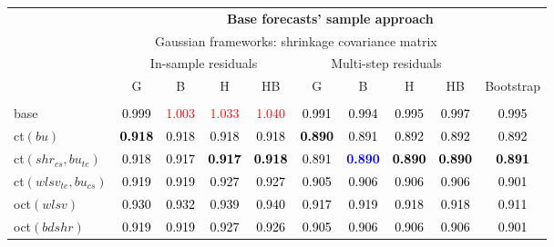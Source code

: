 
\begin{tabular}[t]{>{\centering\arraybackslash}m{2.5cm}ccccccccc}
\toprule
\multicolumn{1}{c}{\textbf{}} & \multicolumn{9}{c}{\textbf{Base forecasts' sample approach}} \\
\cmidrule(l{0pt}r{0pt}){2-10}
\multicolumn{1}{c}{} & \multicolumn{8}{c}{Gaussian frameworks: shrinkage covariance matrix} & \multicolumn{1}{c}{} \\
\multicolumn{1}{c}{} & \multicolumn{4}{c}{In-sample residuals} & \multicolumn{4}{c}{Multi-step residuals} & \multicolumn{1}{c}{} \\
\multirow{-5}{*}{\parbox{2cm}{\centering\textbf{Reconciliation\\approach}}} & G & B & H & HB & G & B & H & HB & \multirow{-4}{*}{Bootstrap}\\
\midrule
\addlinespace[0.3em]
\multicolumn{10}{c}{\textbf{$\forall k \in \{2,1\}$}}\\
base & \textcolor{black}{0.999} & \textcolor{red}{1.003} & \textcolor{red}{1.033} & \textcolor{red}{1.040} & \textcolor{black}{0.991} & \textcolor{black}{0.994} & \textcolor{black}{0.995} & \textcolor{black}{0.997} & \textcolor{black}{0.995}\\
ct$(bu)$ & \textcolor{black}{\textbf{0.918}} & \textcolor{black}{0.918} & \textcolor{black}{0.918} & \textcolor{black}{0.918} & \textcolor{black}{\textbf{0.890}} & \textcolor{black}{0.891} & \textcolor{black}{0.892} & \textcolor{black}{0.892} & \textcolor{black}{0.892}\\
ct$(shr_{cs}, bu_{te})$ & \textcolor{black}{0.918} & \textcolor{black}{0.917} & \textcolor{black}{\textbf{0.917}} & \textcolor{black}{\textbf{0.918}} & \textcolor{black}{0.891} & \textcolor{blue}{\textbf{0.890}} & \textcolor{black}{\textbf{0.890}} & \textcolor{black}{\textbf{0.890}} & \textcolor{black}{\textbf{0.891}}\\
ct$(wlsv_{te}, bu_{cs})$ & \textcolor{black}{0.919} & \textcolor{black}{0.919} & \textcolor{black}{0.927} & \textcolor{black}{0.927} & \textcolor{black}{0.905} & \textcolor{black}{0.906} & \textcolor{black}{0.906} & \textcolor{black}{0.906} & \textcolor{black}{0.901}\\
oct$(wlsv)$ & \textcolor{black}{0.930} & \textcolor{black}{0.932} & \textcolor{black}{0.939} & \textcolor{black}{0.940} & \textcolor{black}{0.917} & \textcolor{black}{0.919} & \textcolor{black}{0.918} & \textcolor{black}{0.918} & \textcolor{black}{0.911}\\
oct$(bdshr)$ & \textcolor{black}{0.919} & \textcolor{black}{0.919} & \textcolor{black}{0.927} & \textcolor{black}{0.926} & \textcolor{black}{0.905} & \textcolor{black}{0.906} & \textcolor{black}{0.906} & \textcolor{black}{0.906} & \textcolor{black}{0.901}\\

\end{tabular}
